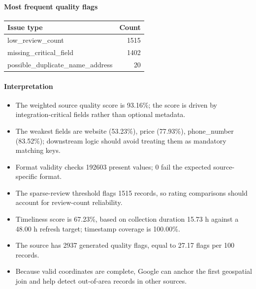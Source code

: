 \paragraph{Most frequent quality flags}
\begin{tabular}{lr}
\toprule
Issue type & Count \\
\midrule
low\_review\_count & 1515 \\
missing\_critical\_field & 1402 \\
possible\_duplicate\_name\_address & 20 \\
\bottomrule
\end{tabular}

\paragraph{Interpretation}
\begin{itemize}
\item The weighted source quality score is 93.16\%; the score is driven by integration-critical fields rather than optional metadata.
\item The weakest fields are website (53.23\%), price (77.93\%), phone\_number (83.52\%); downstream logic should avoid treating them as mandatory matching keys.
\item Format validity checks 192603 present values; 0 fail the expected source-specific format.
\item The sparse-review threshold flags 1515 records, so rating comparisons should account for review-count reliability.
\item Timeliness score is 67.23\%, based on collection duration 15.73 h against a 48.00 h refresh target; timestamp coverage is 100.00\%.
\item The source has 2937 generated quality flags, equal to 27.17 flags per 100 records.
\item Because valid coordinates are complete, Google can anchor the first geospatial join and help detect out-of-area records in other sources.
\end{itemize}
